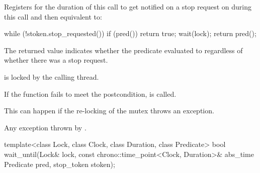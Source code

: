 \begin{itemdescr}
\pnum
\effects
Registers for the duration of this call 
to get notified on a stop request on 
during this call and then equivalent to:
\begin{codeblock}
while (!stoken.stop_requested()) {
  if (pred())
    return true;
  wait(lock);
}
return pred();
\end{codeblock}

\pnum
\begin{note}
The returned value indicates whether the predicate evaluated to
 regardless of whether there was a stop request.
\end{note}

\pnum
\ensures {} is locked by the calling thread.

\pnum
\remarks
If the function fails to meet the postcondition,
 is called.
\begin{note}
This can happen if the re-locking of the mutex throws an exception.
\end{note}

\pnum
\throws Any exception thrown by .
\end{itemdescr}

\begin{itemdecl}
template<class Lock, class Clock, class Duration, class Predicate>
  bool wait_until(Lock& lock, const chrono::time_point<Clock, Duration>& abs_time
                  Predicate pred, stop_token stoken);
\end{itemdecl}

